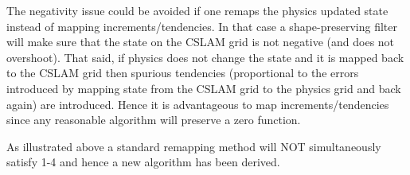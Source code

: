 The negativity issue could be avoided if one remaps the physics updated state instead of mapping increments/tendencies. In that case a shape-preserving filter will make sure that the state on the CSLAM grid is not negative (and does not overshoot). That said, if physics does not change the state and it is mapped back to the CSLAM grid then spurious tendencies (proportional to the errors introduced by mapping state from the CSLAM grid to the physics grid and back again) are introduced. Hence it is advantageous to map increments/tendencies since any reasonable algorithm will preserve a zero function.








As illustrated above a standard remapping method will NOT simultaneously satisfy 1-4 and hence a new algorithm has been derived.
